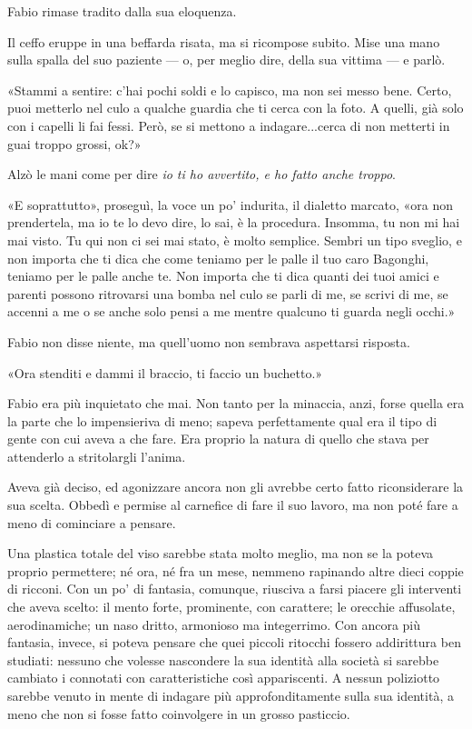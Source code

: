 Fabio rimase tradito dalla sua eloquenza.

Il ceffo eruppe in una beffarda risata, ma si ricompose subito. Mise una mano sulla spalla del suo paziente --- o, per meglio dire, della sua vittima --- e parlò.

«Stammi a sentire: c'hai pochi soldi e lo capisco, ma non sei messo bene. Certo, puoi metterlo nel culo a qualche guardia che ti cerca con la foto. A quelli, già solo con i capelli li fai fessi. Però, se si mettono a indagare...cerca di non metterti in guai troppo grossi, ok?»

Alzò le mani come per dire \emph{io ti ho avvertito, e ho fatto anche troppo}.

«E soprattutto», proseguì, la voce un po' indurita, il dialetto marcato, «ora non prendertela, ma io te lo devo dire, lo sai, è la procedura. Insomma, tu non mi hai mai visto. Tu qui non ci sei mai stato, è molto semplice. Sembri un tipo sveglio, e non importa che ti dica che come teniamo per le palle il tuo caro Bagonghi, teniamo per le palle anche te. Non importa che ti dica quanti dei tuoi amici e parenti possono ritrovarsi una bomba nel culo se parli di me, se scrivi di me, se accenni a me o se anche solo pensi a me mentre qualcuno ti guarda negli occhi.»

Fabio non disse niente, ma quell'uomo non sembrava aspettarsi risposta.

«Ora stenditi e dammi il braccio, ti faccio un buchetto.»

Fabio era più inquietato che mai. Non tanto per la minaccia, anzi, forse quella era la parte che lo impensieriva di meno; sapeva perfettamente qual era il tipo di gente con cui aveva a che fare. Era proprio la natura di quello che stava per attenderlo a stritolargli l'anima.

Aveva già deciso, ed agonizzare ancora non gli avrebbe certo fatto riconsiderare la sua scelta. Obbedì e permise al carnefice di fare il suo lavoro, ma non poté fare a meno di cominciare a pensare.

Una plastica totale del viso sarebbe stata molto meglio, ma non se la poteva proprio permettere; né ora, né fra un mese, nemmeno rapinando altre dieci coppie di ricconi. Con un po' di fantasia, comunque, riusciva a farsi piacere gli interventi che aveva scelto: il mento forte, prominente, con carattere; le orecchie affusolate, aerodinamiche; un naso dritto, armonioso ma integerrimo. Con ancora più fantasia, invece, si poteva pensare che quei piccoli ritocchi fossero addirittura ben studiati: nessuno che volesse nascondere la sua identità alla società si sarebbe cambiato i connotati con caratteristiche così appariscenti. A nessun poliziotto sarebbe venuto in mente di indagare più approfonditamente sulla sua identità, a meno che non si fosse fatto coinvolgere in un grosso pasticcio.

